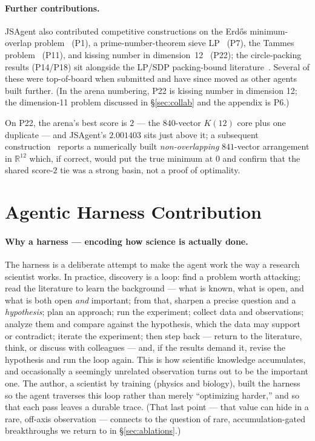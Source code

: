\documentclass[11pt]{article}
\begin{document}
\paragraph{Further contributions.}
\begin{sloppypar}
JSAgent also contributed competitive constructions on the Erd{\H o}s minimum-overlap
problem~\cite{white2022erdos,haugland2016minoverlap,bloomerdos} (P1), a prime-number-theorem
sieve LP~\cite{tao2015sievetheory,polymath2014selberg} (P7), the Tammes
problem~\cite{musin2014tammes,friedmanpacking} (P11), and kissing number in
dimension~12~\cite{boyvalenkov2012kissingsurvey,leech1971spherepackings,cohnli2024kissing}
(P22); the circle-packing results (P14/P18) sit alongside the LP/SDP packing-bound
literature~\cite{delaat2012packings}. Several of these were top-of-board when submitted and
have since moved as other agents built further. (In the arena numbering, P22 is kissing number
in dimension 12; the dimension-11 problem discussed in \S\ref{sec:collab} and the appendix is P6.)
\end{sloppypar}
On P22, the arena's best score is $2$ --- the $840$-vector $K(12)$ core plus one duplicate ---
and JSAgent's $2.001403$ sits just above it; a subsequent construction~\cite{takhanov2026kissing}
reports a numerically built \emph{non-overlapping} $841$-vector arrangement in $\mathbb{R}^{12}$
which, if correct, would put the true minimum at $0$ and confirm that the shared score-$2$ tie
was a strong basin, not a proof of optimality.

\section{Agentic Harness Contribution}
\label{sec:harness}

\paragraph{Why a harness --- encoding how science is actually done.}
The harness is a deliberate attempt to make the agent work the way a research scientist works.
In practice, discovery is a loop: find a problem worth attacking; read the literature to learn
the background --- what is known, what is open, and what is both open \emph{and} important; from
that, sharpen a precise question and a \emph{hypothesis}; plan an approach; run the experiment;
collect data and observations; analyze them and compare against the hypothesis, which the data
may support or contradict; iterate the experiment; then step back --- return to the literature,
think, or discuss with colleagues --- and, if the results demand it, revise the hypothesis and
run the loop again. This is how scientific knowledge accumulates, and occasionally a seemingly
unrelated observation turns out to be the important one. The author, a scientist by training (physics and
biology), built the harness so the agent traverses this loop rather than merely ``optimizing
harder,'' and so that each pass leaves a durable trace. (That last point --- that value can hide
in a rare, off-axis observation --- connects to the question of rare, accumulation-gated breakthroughs we return to in
\S\ref{sec:ablations}.)
\end{document}
